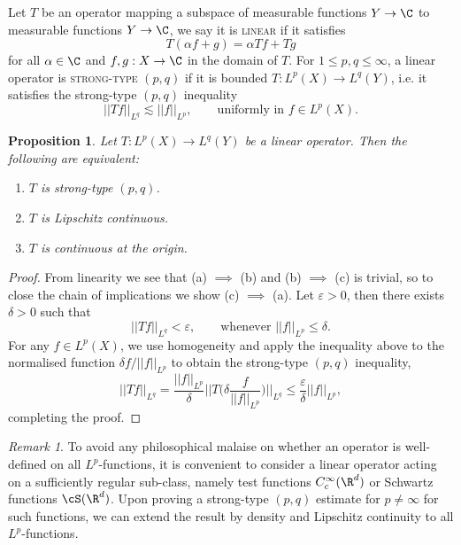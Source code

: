 \documentclass[reqno]{amsart}
\newtheorem{proposition}[theorem]{Proposition}
\theoremstyle{definition}
\theoremstyle{remark}
\newtheorem*{remark}{Remark}
\renewcommand{\epsilon}{\varepsilon}
\renewcommand{\emph}{\textsc}
\begin{document}
Let $T$ be an operator mapping a subspace of measurable functions $Y \to \C$ to measurable functions $Y \to \C$, we say it is \emph{linear} if it satisfies
	\[ T(\alpha f + g) = \alpha Tf + Tg \]
for all $\alpha \in \C$ and $f, g : X \to \C$ in the domain of $T$. For $1 \leq p, q \leq \infty$, a linear operator is \emph{strong-type} $(p, q)$ if it is bounded $T: L^p (X) \to L^q(Y)$, i.e. it satisfies the strong-type $(p, q)$ inequality
	\[ ||Tf||_{L^q} \lesssim ||f||_{L^p}, \qquad \text{uniformly in $f \in L^p(X)$.} \]
\begin{proposition}
	Let $T : L^p (X) \to L^q (Y)$ be a linear operator. Then the following are equivalent:
	\begin{enumerate}
		\item $T$ is strong-type $(p, q)$.
		\item $T$ is Lipschitz continuous.
		\item $T$ is continuous at the origin. 
	\end{enumerate}
\end{proposition}
	
\begin{proof}
	From linearity we see that (a) $\implies$ (b) and (b) $\implies$ (c) is trivial, so to close the chain of implications we show (c) $\implies$ (a). Let $\epsilon > 0$, then there exists $\delta > 0$ such that 
		\[ ||Tf||_{L^q} < \epsilon, \qquad \text{whenever } ||f||_{L^p} \leq \delta. \]
	For any $f \in L^p (X)$, we use homogeneity and apply the inequality above to the normalised function $\delta f/||f||_{L^p}$ to obtain the strong-type $(p, q)$ inequality, 
		\[ ||Tf||_{L^q} = \frac{||f||_{L^p}}{\delta} \Big|\Big|T \Big(\delta \frac{f}{||f||_{L^p}}\Big) \Big|\Big|_{L^q} \leq \frac{\epsilon}{\delta} ||f||_{L^p}, \]
	completing the proof. 	
\end{proof}

\begin{remark}
	To avoid any philosophical malaise on whether an operator is well-defined on all $L^p$-functions, it is convenient to consider a linear operator acting on a sufficiently regular sub-class, namely test functions $C^\infty_c (\R^d)$ or Schwartz functions $\cS (\R^d)$. Upon proving a strong-type $(p, q)$ estimate for $p \neq \infty$ for such functions, we can extend the result by density and Lipschitz continuity to all $L^p$-functions. 
\end{remark}
\end{document}
